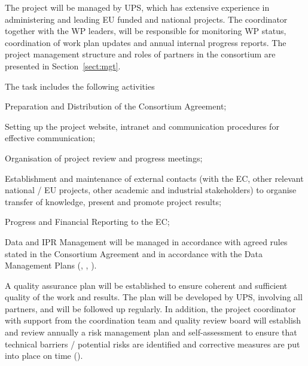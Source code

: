 \begin{workpackage}
\begin{wpdescription}
The project will be managed by UPS, which has extensive experience in
administering and leading EU funded and national projects. The
coordinator together with the WP leaders, will be responsible for
monitoring WP status, coordination of work plan updates and annual
internal progress reports. The project management structure and roles
of partners in the consortium are presented in Section~\ref{sect:mgt}.
\end{wpdescription}

\begin{tasklist}
\begin{task}[title=Project and financial management,
  id=project-finance-management,lead=UPSud,PM=33,wphases={0-48!.2,0-3,10-12,22-24,34-36,42-48},
  partners={LL,UV,UJF,UB,UO,USH,USO,SA,UW,JU,UK,US,ZH,SR}]
The task includes the following activities
  \begin{compactitem}
  \item Preparation and Distribution of the
    Consortium Agreement;
  \item Setting up the project website, intranet and
    communication procedures for effective communication;
  \item
    Organisation of project review and progress meetings;
  \item
    Establishment and maintenance of external contacts (with the EC,
    other relevant national / EU projects, other academic and
    industrial stakeholders) to organise transfer of knowledge,
    present and promote project results;
  \item Progress and Financial Reporting to the EC;
  \item Data and IPR Management will be managed in accordance with
    agreed rules stated in the Consortium Agreement and in accordance
    with the Data Management Plans
    (, , ).
  \end{compactitem}
\end{task}

\begin{task}[title=Quality assurance and risk management,id=project-quality-management,
  wphases=6-48!.3,
  lead=UPSud,PM=15,partners={LL,UV,UJF,UB,UO,USH,USO,SA,UW,JU,UK,US,ZH,SR}]
  A quality assurance plan will be established to ensure coherent and
  sufficient quality of the work and results. The plan will be
  developed by UPS, involving all partners, and will be followed up
  regularly. In addition, the project coordinator with support from
  the coordination team and quality review board will establish and
  review annually a risk management plan and self-assessment to ensure
  that technical barriers / potential risks are identified and
  corrective measures are put into place on time
  ().
\end{task}


\end{tasklist}
\end{workpackage}
